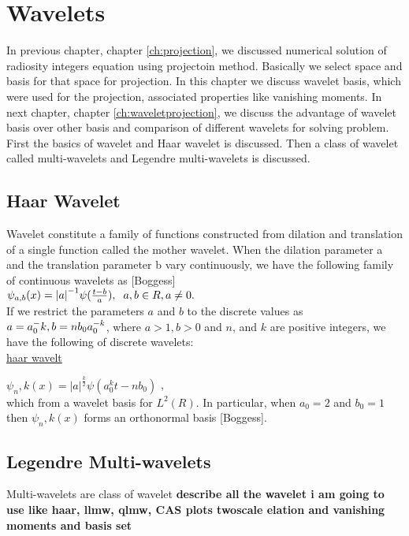 \chapter{\label{ch:wavelets}Wavelets}
In previous chapter, chapter \ref{ch:projection}, we discussed numerical solution of radiosity integers equation using projectoin method. Basically we select space and basis for that space for projection. In this chapter we discuss wavelet basis, which were used for the projection, associated properties like vanishing moments. In next chapter, chapter \ref{ch:waveletprojection}, we discuss the advantage of wavelet basis over other basis and comparison of different wavelets for solving problem. First the basics of wavelet and Haar wavelet is discussed. Then a class of wavelet called multi-wavelets and Legendre multi-wavelets is discussed.
\section{Haar Wavelet}
Wavelet constitute a family of functions constructed from dilation and translation of a single function called the mother wavelet. When the dilation parameter a and the translation parameter b vary continuously, we have the following family of continuous wavelets as [Boggess]\\

$\psi_{a,b}(x) = {|a|}^{-1} \psi(\frac {t-b}{a})
,   \hspace{0.2cm} a,b \in R, a \neq 0.
$\\

If we restrict the parameters $a$ and $b$ to the discrete values as $a = a_0 ^-k, \\b = n b_0 a_0^{-k}$, where $a>1,b>0$ and $n$, and $k$ are positive integers, we have the following of discrete wavelets:\\

\underline{haar wavelt}

$\psi_n,k(x) = |a|^\frac{k}{2} \psi(a_0^k t - nb_0)$ ,\\
 which from a wavelet basis for $L^2(R)$. In particular, when $a_0 = 2$ and $b_0 = 1$ then $\psi_n,k (x)$ forms an orthonormal basis [Boggess].
 

 \section{Legendre Multi-wavelets}
 Multi-wavelets are class of wavelet 
 {\bf describe all the wavelet i am going to use like haar, llmw, qlmw, CAS 
 plots twoscale elation and vanishing moments and basis set}
 
 
